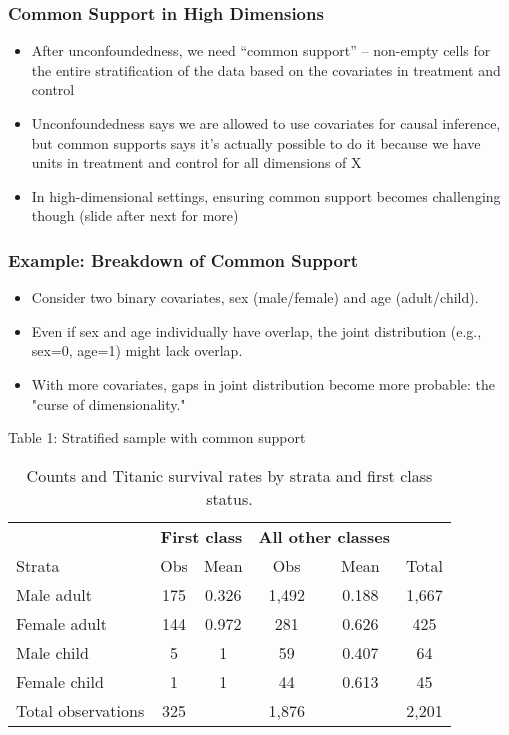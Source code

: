 \documentclass{beamer}
\begin{document}
\begin{frame}
\frametitle{Common Support in High Dimensions}
\begin{itemize}
	\item After unconfoundedness, we need ``common support'' -- non-empty cells for the entire stratification of the data based on the covariates in treatment and control
	\item Unconfoundedness says we are allowed to use covariates for causal inference, but common supports says it's actually possible to do it because we have units in treatment and control for all dimensions of X
    \item In high-dimensional settings, ensuring common support becomes challenging though (slide after next for more)
\end{itemize}
\end{frame}



\begin{frame}
\frametitle{Example: Breakdown of Common Support}
\begin{itemize}
    \item Consider two binary covariates, sex (male/female) and age (adult/child).
    \item Even if sex and age individually have overlap, the joint distribution (e.g., sex=0, age=1) might lack overlap.
    \item With more covariates, gaps in joint distribution become more probable: the "curse of dimensionality."
\end{itemize}
\end{frame}

\begin{frame}{Table 1: Stratified sample with common support}

{\renewcommand{\arraystretch}{1.1}
\tabcolsep 		
\begin{table}\small{}
\caption{Counts and Titanic survival rates by strata and first class status.}
\centering
\begin{tabular}{lcc|cc|c}
\toprule
\multicolumn{1}{c}{\textbf{}}&
\multicolumn{2}{c}{\textbf{First class}}&
\multicolumn{2}{c}{\textbf{All other classes}}&
\multicolumn{1}{c}{\textbf{}}\\
\multicolumn{1}{l}{Strata}&
\multicolumn{1}{c}{Obs}&
\multicolumn{1}{c}{Mean}&
\multicolumn{1}{c}{Obs}&
\multicolumn{1}{c}{Mean}&
\multicolumn{1}{c}{Total}\\
\midrule
Male adult		& 175	& 0.326	& 1,492	& 0.188	& 1,667 \\
Female adult	& 144	& 0.972	& 281	& 0.626	& 425 \\
Male child		& 5		& 1		& 59		& 0.407 	& 64\\
Female child	& 1		& 1		& 44		& 0.613 	& 45\\
\midrule
Total	observations	& 325	&&	1,876	 && 2,201\\
\bottomrule
\end{tabular}
\label{tab:titanic-counts}
\end{table}}

\end{frame}
\end{document}
